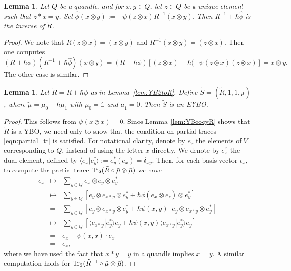 \documentclass[11pt,fleqn]{amsart} %
\newtheorem{lemma}[theorem]{Lemma}
\begin{document}
\begin{lemma}\label{lem:Rinverse}
Let $Q$ be a quandle, and for  $x, y \in Q$, 
let $z \in Q$ be a unique element such that $z*x=y$. 
Set  $\hat \phi (x \otimes y) := - \psi (z\otimes x ) R^{-1} (x \otimes y) $.
Then $R^{-1} + \hbar \hat \phi$ is the inverse of $\tilde R$.  
\end{lemma}

\begin{proof}
We note that $R (z \otimes x)=(x \otimes y)$ and $R^{-1} (x \otimes y)=(z \otimes x)$.
Then one computes 
$$ (R + \hbar \phi ) (R^{-1} + \hbar \hat \phi) ( x\otimes y) 
= (R + \hbar \phi )[  (z \otimes x) + \hbar (- \psi (z \otimes x) (z \otimes x) ]
= x \otimes y .
$$
The other case is similar.
\end{proof}



\begin{lemma}		\label{lem:QEYBO}
Let $\tilde R= R+ \hbar \phi $
as in Lemma~\ref{lem:YB2toR}.	Define  $\tilde S=( \tilde R, 1, 1, \tilde \mu)$,
			where $\tilde \mu = \mu_0 + \hbar \mu_1$ with $\mu_0=\mathbb 1$ and $\mu_1=0$.
			Then $\tilde S$ is an EYBO.
\end{lemma}			

\begin{proof}			 			This follows from $\psi(x\otimes x) = 0$.
	Since Lemma~\ref{lem:YBcocyR} shows that $\tilde R$ 
	  is a YBO, we need only to show that the condition on partial traces \eqref{eqn:partial_tr} is satisfied. For notational clarity, 
	  denote by $e_x$ the elements of $V$ corresponding to $Q$, instead of using the letter $x$ directly. We denote by $e_x^*$ the dual element, defined by $\langle e_x| e_y^*\rangle := e_y^*(e_x) = \delta_{xy}$. Then, for each basis vector $e_x$, to compute the partial trace ${\rm Tr}_2(\tilde R\circ\tilde \mu\otimes \tilde \mu)$ we have
	 	\begin{eqnarray*}
	 			e_x
	 			&\mapsto& \sum_{y\in Q} e_x \otimes e_y \otimes e_y^*\\
	 			&\mapsto& \sum_{y\in Q} [e_y \otimes e_{x*y} \otimes e_y^*+\hbar \phi(e_x\otimes e_y) \otimes e_y^*]\\
	 			&=& \sum_{y\in Q} [e_y \otimes e_{x*y} \otimes e_y^*+\hbar \psi(x,y)\cdot  e_y \otimes e_{x*y} \otimes e_y^*]\\
	 			&\mapsto& \sum_{y\in Q}[ \langle e_{x*y}|e_y^*\rangle e_y + \hbar \psi(x,y) \langle e_{x*y}|e_y^*\rangle e_y]\\
	 			&=& e_x + \psi(x,x)\cdot e_x\\
	 			&=& e_x, 
	 	\end{eqnarray*}
 		where we have used the fact that $x*y=y$ in a quandle implies $x=y$. A similar computation holds for ${\rm Tr}_2(\tilde R^{-1}\circ\tilde \mu\otimes \tilde \mu)$. 
\end{proof}		
\end{document}

